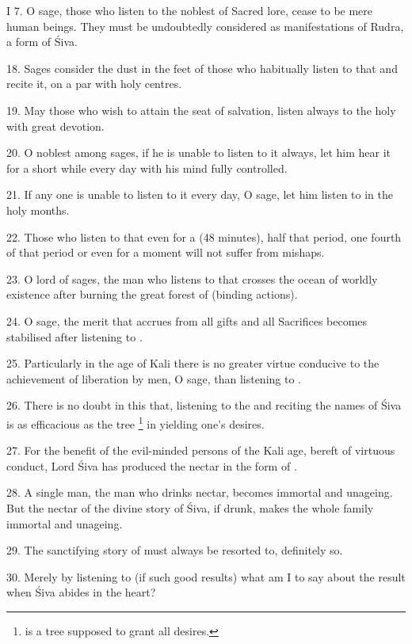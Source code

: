 I 7. O sage, those who listen to  the noblest of Sacred lore,
cease to be mere human beings. They must be undoubtedly considered as
manifestations of Rudra, a form of Śiva.

18. Sages consider the dust in the feet of those who habitually listen to that
 and recite it, on a par with holy centres.

19. May those who wish to attain the seat of salvation, listen always to the holy
 with great devotion.

20. O noblest among sages, if he is unable to listen to it always, let him hear
it for a short while every day with his mind fully controlled.

21. If any one is unable to listen to it every day, O sage, let him listen to
 in the holy months.

22. Those who listen to that  even for a  (48 minutes),
half that period, one fourth of that period or even for a moment will not suffer
from mishaps.

23. O lord of sages, the man who listens to that  crosses the ocean
of worldly existence after burning the great forest of  (binding actions).

24. O sage, the merit that accrues from all gifts and all Sacrifices becomes
stabilised after listening to .

25. Particularly in the age of Kali there is no greater virtue conducive to the
achievement of liberation by men, O sage, than listening to .

26. There is no doubt in this that, listening to the  and reciting
the names of Śiva is as efficacious as the  tree
\footnote{ is a tree supposed to grant all desires.} in yielding
one’s desires.

27. For the benefit of the evil-minded persons of the Kali age, bereft of
virtuous conduct, Lord Śiva has produced the nectar in the form of
.

28. A single man, the man who drinks nectar, becomes immortal and unageing. But
the nectar of the divine story of Śiva, if drunk, makes the whole family
immortal and unageing.

29. The sanctifying story of  must always be resorted to,
definitely so.

30. Merely by listening to  (if such good results) what am I to
say about the result when Śiva abides in the heart?

